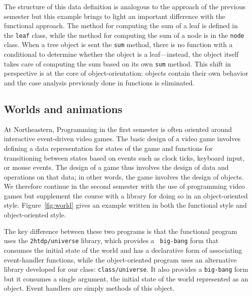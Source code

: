 \documentclass[submission,copyright]{eptcs}
\begin{document}
The structure of this data definition is analogous to the approach of
the previous semester but this example brings to light an important
difference with the functional approach.  The method for computing the
sum of a leaf is defined in the {\tt leaf} class, while the
method for computing the sum of a node is in the {\tt node} class.
When a tree object is sent the {\tt sum} method, there is no function
with a conditional to determine whether the object is a
leaf---instead, the object itself takes care of computing the sum
based on its own {\tt sum} method.  This shift in perspective
is at the core of object-orientation: objects contain their own
behavior and the case analysis previously done in functions is
eliminated.





\subsection{Worlds and animations}

At Northeastern, Programming in the first semester is often oriented
around interactive event-driven video games.  The basic design of a
video game involves defining a data representation for states of the
game and functions for transitioning between states based on events
such as clock ticks, keyboard input, or mouse events.  The design of a
game thus involves the design of data and operations on that data; in
other words, the game involves the design of objects.  We therefore
continue in the second semester with the use of programming video
games but supplement the course with a library for doing so in an
object-oriented style.  Figure~\ref{fig:world} gives an example
written in both the functional style and object-oriented style.

The key difference between these two programs is that the functional
program uses the {\tt 2htdp/universe} library, which provides a {\tt
  big-bang} form that consumes the initial state of the world and has
a declarative form of associating event-handler functions, while the
object-oriented program uses an alternative library developed for our
class: {\tt class/universe}.  It also provides a {\tt big-bang} form
but it consumes a single argument, the initial state of the world
represented as an object.  Event handlers are simply methods of this
object.
\end{document}

